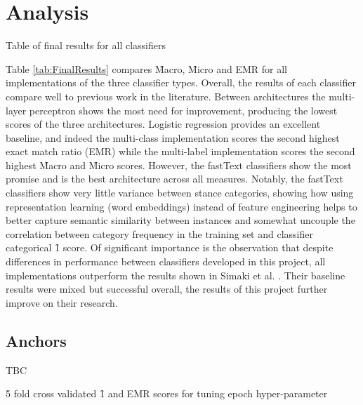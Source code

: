 \documentclass[Dissertation.tex]{subfiles}
\begin{document}
\section{Analysis}
\begin{table}
	\caption{Table of final results for all classifiers}
	\label{tab:FinalResults}
	\centering
	
\end{table}
Table \ref{tab:FinalResults} compares \f{Macro}, \f{Micro} and EMR for all implementations of the three classifier types. Overall, the results of each classifier compare well to previous work in the literature. Between architectures the multi-layer perceptron shows the most need for improvement, producing the lowest scores of the three architectures.  Logistic regression provides an excellent baseline, and indeed the multi-class implementation scores the second highest exact match ratio (EMR) while the multi-label implementation scores the second highest \f{Macro} and \f{Micro} scores. However, the fastText classifiers show the most promise and is the best architecture across all measures. Notably, the fastText classifiers show very little variance between stance categories, showing how using representation learning (word embeddings) instead of feature engineering helps to better capture semantic similarity between instances and somewhat uncouple the correlation between category frequency in the training set and classifier categorical \f{1} score. Of significant importance is the observation that despite differences in performance between classifiers developed in this project, all implementations outperform the results shown in Simaki et al. \cite{simakiStanceClassificationTexts2017}. Their baseline results were mixed but successful overall, the results of this project further improve on their research. 




\subsection{Anchors}
TBC
\begin{table}[h]
	\caption{5 fold cross validated \f{1} and EMR scores for tuning epoch hyper-parameter}
	\label{tab:crossValEpoch}
	\centering
	\begin{subfigure}{0.5\linewidth}
		\centering
			
	\end{subfigure}\hspace*{1em}\begin{subfigure}{0.5\linewidth}
		\centering
			
	\end{subfigure}
	
\end{table}
\end{document}
